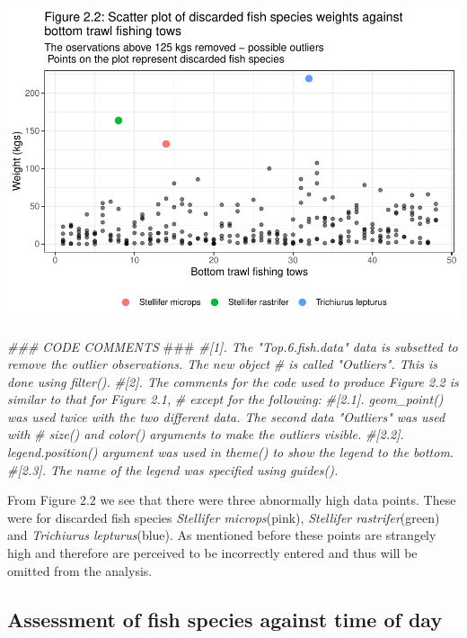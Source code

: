 \documentclass[
]{book}
\newenvironment{Shaded}{\begin{snugshade}}{\end{snugshade}}
\newcommand{\AlertTok}[1]{\textcolor[rgb]{0.94,0.16,0.16}{#1}}
\newcommand{\CommentTok}[1]{\textcolor[rgb]{0.56,0.35,0.01}{\textit{#1}}}
\begin{document}
\begin{center}\includegraphics{bookdown-demo_files/figure-latex/unnamed-chunk-12-1} \end{center}

\begin{Shaded}
\begin{Highlighting}[]
\CommentTok{### CODE COMMENTS }\AlertTok{###}
\CommentTok{#[1]. The "Top.6.fish.data" data is subsetted to remove the outlier observations. The new object }
\CommentTok{#     is called "Outliers". This is done using filter(). }
\CommentTok{#[2]. The comments for the code used to produce Figure 2.2 is similar to that for Figure 2.1, }
\CommentTok{#     except for the following:}
\CommentTok{#[2.1]. geom_point() was used twice with the two different data. The second data "Outliers" was used with }
\CommentTok{#       size() and color() arguments to make the outliers visible.}
\CommentTok{#[2.2]. legend.position() argument was used in theme() to show the legend to the bottom.}
\CommentTok{#[2.3]. The name of the legend was specified using guides(). }
\end{Highlighting}
\end{Shaded}

From Figure 2.2 we see that there were three abnormally high data points. These were for discarded fish species \emph{Stellifer microps}(pink), \emph{Stellifer rastrifer}(green) and \emph{Trichiurus lepturus}(blue). As mentioned before these points are strangely high and therefore are perceived to be incorrectly entered and thus will be omitted from the analysis.

\hypertarget{assessment-of-fish-species-against-time-of-day}{%
\subsection{Assessment of fish species against time of day}\label{assessment-of-fish-species-against-time-of-day}}
\end{document}
